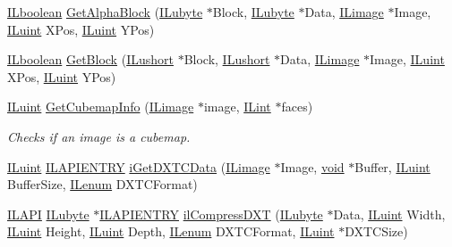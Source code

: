 \begin{DoxyCompactItemize}
\item 
\hyperlink{il_8h_a8be80d75c2c636b9f2250fe10c2e7874}{I\-Lboolean} \hyperlink{il__dds-save_8c_a865a499a23ceff7c929b1f10763d31db}{Get\-Alpha\-Block} (\hyperlink{il_8h_a8d2f04500100a86d1b00e98ab1b15a33}{I\-Lubyte} $\ast$Block, \hyperlink{il_8h_a8d2f04500100a86d1b00e98ab1b15a33}{I\-Lubyte} $\ast$Data, \hyperlink{struct_i_limage}{I\-Limage} $\ast$Image, \hyperlink{il_8h_ac6508d0e9c19e32f32e00d54b5b8cf30}{I\-Luint} X\-Pos, \hyperlink{il_8h_ac6508d0e9c19e32f32e00d54b5b8cf30}{I\-Luint} Y\-Pos)
\item 
\hyperlink{il_8h_a8be80d75c2c636b9f2250fe10c2e7874}{I\-Lboolean} \hyperlink{il__dds-save_8c_aceacb54be1f7622a3228ce727fad6047}{Get\-Block} (\hyperlink{il_8h_af6287b43748354a7c4864da43ae56962}{I\-Lushort} $\ast$Block, \hyperlink{il_8h_af6287b43748354a7c4864da43ae56962}{I\-Lushort} $\ast$Data, \hyperlink{struct_i_limage}{I\-Limage} $\ast$Image, \hyperlink{il_8h_ac6508d0e9c19e32f32e00d54b5b8cf30}{I\-Luint} X\-Pos, \hyperlink{il_8h_ac6508d0e9c19e32f32e00d54b5b8cf30}{I\-Luint} Y\-Pos)
\item 
\hyperlink{il_8h_ac6508d0e9c19e32f32e00d54b5b8cf30}{I\-Luint} \hyperlink{il__dds-save_8c_aeccdfbd9b3183b2e7af9d83de833c01e}{Get\-Cubemap\-Info} (\hyperlink{struct_i_limage}{I\-Limage} $\ast$image, \hyperlink{il_8h_a288a97fb9e92e707a60b749d0039fafe}{I\-Lint} $\ast$faces)
\begin{DoxyCompactList}\small\item\em Checks if an image is a cubemap. \end{DoxyCompactList}\item 
\hyperlink{il_8h_ac6508d0e9c19e32f32e00d54b5b8cf30}{I\-Luint} \hyperlink{il_8h_a69c08a8d06df986f7e46f209d131ef2f}{I\-L\-A\-P\-I\-E\-N\-T\-R\-Y} \hyperlink{il__dds-save_8c_adfc213f12d2cf6f731f902e53ee73843}{i\-Get\-D\-X\-T\-C\-Data} (\hyperlink{struct_i_limage}{I\-Limage} $\ast$Image, \hyperlink{il_8h_a5530e04d947bcddd83639ea7940faf10}{void} $\ast$Buffer, \hyperlink{il_8h_ac6508d0e9c19e32f32e00d54b5b8cf30}{I\-Luint} Buffer\-Size, \hyperlink{il_8h_a1542f3a70c0c5370a30a1fa5ce349e2d}{I\-Lenum} D\-X\-T\-C\-Format)
\item 
\hyperlink{il_8h_aedb0c8b2b033d0612e3d784d2f598758}{I\-L\-A\-P\-I} \hyperlink{il_8h_a8d2f04500100a86d1b00e98ab1b15a33}{I\-Lubyte} $\ast$\hyperlink{il_8h_a69c08a8d06df986f7e46f209d131ef2f}{I\-L\-A\-P\-I\-E\-N\-T\-R\-Y} \hyperlink{il__dds-save_8c_a016b03ccbf86f6ba37d6c24b3357f9d1}{il\-Compress\-D\-X\-T} (\hyperlink{il_8h_a8d2f04500100a86d1b00e98ab1b15a33}{I\-Lubyte} $\ast$Data, \hyperlink{il_8h_ac6508d0e9c19e32f32e00d54b5b8cf30}{I\-Luint} Width, \hyperlink{il_8h_ac6508d0e9c19e32f32e00d54b5b8cf30}{I\-Luint} Height, \hyperlink{il_8h_ac6508d0e9c19e32f32e00d54b5b8cf30}{I\-Luint} Depth, \hyperlink{il_8h_a1542f3a70c0c5370a30a1fa5ce349e2d}{I\-Lenum} D\-X\-T\-C\-Format, \hyperlink{il_8h_ac6508d0e9c19e32f32e00d54b5b8cf30}{I\-Luint} $\ast$D\-X\-T\-C\-Size)

\end{DoxyCompactItemize}
